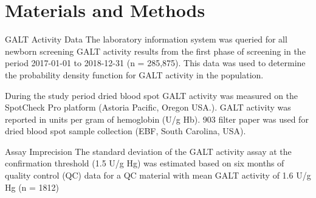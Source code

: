\documentclass[review]{elsarticle}
\begin{document}
\section*{Materials and Methods}
\label{sec:orgbd7b27b}
\begin{frame}[label={sec:org1e9b505}]{GALT Activity Data}
The laboratory information system was queried for all newborn
screening GALT activity results from the first phase of screening in
the period 2017-01-01 to 2018-12-31 (n = 285,875). This data was used
to determine the probability density function for GALT activity in the
population.

During the study period dried blood spot GALT activity was measured
on the SpotCheck Pro platform (Astoria Pacific, Oregon USA.). GALT
activity was reported in units per gram of hemoglobin (U/g Hb). 903
filter paper was used for dried blood spot sample collection (EBF,
South Carolina, USA).
\end{frame}

\begin{frame}[label={sec:org8086b41}]{Assay Imprecision}
The standard deviation of the GALT activity assay at the confirmation
threshold (1.5 U/g Hg) was estimated based on six months of quality
control (QC) data for a QC material with mean GALT activity of 1.6 U/g
Hg (n = 1812)
\end{frame}
\end{document}
